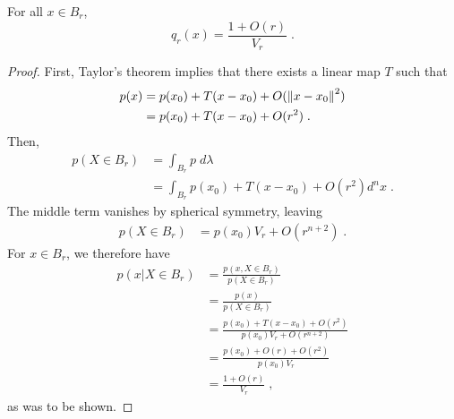 \documentclass[english]{scrartcl}
\begin{document}
	\begin{lm}
		For all $x \in B_r$,  
		\begin{equation*}
			q_r(x) = \frac{1 + O(r)}{V_r}\;.	
		\end{equation*}
	\end{lm}
	\begin{proof}
		First, Taylor's theorem implies that there exists a linear map $T$ such that 
		\begin{align*}
			p(x) &= p(x_0) + T(x - x_0) + O(\left\lVert x - x_0\right\rVert^2) \\
			&= p(x_0) + T(x - x_0) + O(r^2)\;. 
		\end{align*}
		 Then, 
		\begin{align*}
			p(X\in B_r) &= \int_{B_r} p \; d\lambda \\
			&= \int_{B_r} p(x_0) + T(x - x_0) + O(r^2) d^n x\;.
		\end{align*}
		The middle term vanishes by spherical symmetry, leaving 
		\begin{align*}
			p(X\in B_r) &= p(x_0)V_r  + O(r^{n+2})\;.
		\end{align*}
		For $x \in B_r$, we therefore have 
		\begin{align*}
			p(x|X \in B_r) &= \frac{p(x,X \in B_r)}{p(X \in B_r)} \\ 
			&= \frac{p(x)}{p(X \in B_r)} \\
			&= \frac{p(x_0) + T(x - x_0) + O(r^2)}{p(x_0)V_r  + O(r^{n+2})} \\
			&= \frac{p(x_0) + O(r) + O(r^2)}{p(x_0)V_r} \\
			&= \frac{1 + O(r)}{V_r}\;,
		\end{align*}
		as was to be shown. 
	\end{proof}
\end{document}

